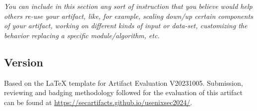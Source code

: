 \textit{You can include in this section any sort of instruction that you believe
would help others re-use your artifact, like, for example, scaling down/up
certain components of your artifact, working on different kinds of input or
data-set, customizing the behavior replacing a specific module/algorithm, etc.}


\subsection{Version}
Based on the LaTeX template for Artifact Evaluation V20231005. Submission,
reviewing and badging methodology followed for the evaluation of this artifact
can be found at \url{https://secartifacts.github.io/usenixsec2024/}.